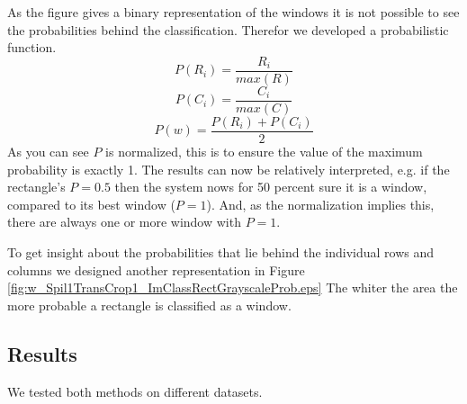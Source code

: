 As the figure gives a binary representation of the windows it is not possible
to see the probabilities behind the classification.
Therefor we developed a probabilistic function. 
\[P(R_i) = \frac{R_i}{max(R)}\]
\[P(C_i) = \frac{C_i}{max(C)}\]
\[P(w) = \frac{P(R_i) + P(C_i)}{2}\]
As you can see $P$ is normalized, this is to ensure the value of the maximum
probability is exactly 1. The results can now be relatively interpreted, e.g. if the rectangle's $P=0.5$
then the system nows for 50 percent sure it is a window, compared to its best window ($P=1$). 
And, as the normalization implies this, there are always one or more window with $P=1$. 

To get insight about the probabilities that lie behind the individual rows and columns
we designed another representation in Figure \ref{fig:w_Spil1TransCrop1_ImClassRectGrayscaleProb.eps}
The whiter the area the more probable a rectangle is classified as a window.



\subsection{Results}
We tested both methods on different datasets.

\newpage
{}






